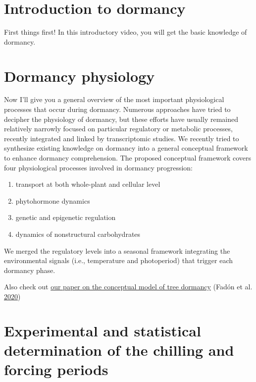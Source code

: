 \documentclass[
]{book}
\providecommand{\tightlist}{%
  \setlength{\itemsep}{0pt}\setlength{\parskip}{0pt}}
\begin{document}
\hypertarget{introduction-to-dormancy}{%
\section{Introduction to dormancy}\label{introduction-to-dormancy}}

First things first! In this introductory video, you will get the basic knowledge of dormancy.

\hypertarget{dormancy-physiology}{%
\section{Dormancy physiology}\label{dormancy-physiology}}

Now I'll give you a general overview of the most important physiological processes that occur during dormancy. Numerous approaches have tried to decipher the physiology of dormancy, but these efforts have usually remained relatively narrowly focused on particular regulatory or metabolic processes, recently integrated and linked by transcriptomic studies. We recently tried to synthesize existing knowledge on dormancy into a general conceptual framework to enhance dormancy comprehension. The proposed conceptual framework covers four physiological processes involved in dormancy progression:

\begin{enumerate}
\def\labelenumi{(\roman{enumi})}
\tightlist
\item
  transport at both whole-plant and cellular level
\item
  phytohormone dynamics
\item
  genetic and epigenetic regulation
\item
  dynamics of nonstructural carbohydrates
\end{enumerate}

We merged the regulatory levels into a seasonal framework integrating the environmental signals (i.e., temperature and photoperiod) that trigger each dormancy phase.

Also check out \href{https://www.mdpi.com/2073-4395/10/2/241/htm}{our paper on the conceptual model of tree dormancy} (Fadón et al. \protect\hyperlink{ref-fadon2020conceptual}{2020})

\hypertarget{experimental-and-statistical-determination-of-the-chilling-and-forcing-periods}{%
\section{Experimental and statistical determination of the chilling and forcing periods}\label{experimental-and-statistical-determination-of-the-chilling-and-forcing-periods}}
\end{document}
